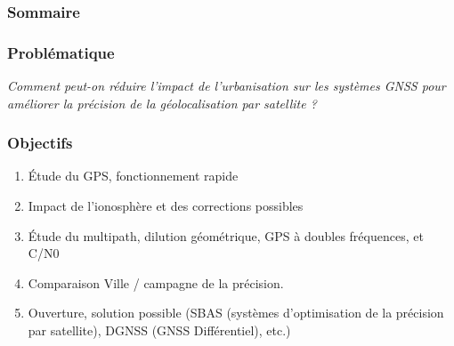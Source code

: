\documentclass[xcolor=dvipsnames,envcountsect]{beamer}
\begin{document}
\begin{frame}{\frametitle{Sommaire}\tableofcontents}\end{frame}

\begin{frame}
	\frametitle{Problématique}
	\centering
	\begin{block}
		\scshape
			\begin{center}
				\Huge\emph{Comment peut-on réduire l'impact de l'urbanisation sur les systèmes GNSS pour améliorer la
				précision de la géolocalisation par satellite ?}
			\end{center}
	\end{block}
\end{frame}

\begin{frame}
	\frametitle{Objectifs}
	\justifying
	\begin{enumerate}
		
		\item Étude du GPS, fonctionnement rapide
		\item Impact de l'ionosphère et des corrections possibles
		\item Étude du multipath, dilution géométrique, GPS à doubles fréquences, et C/N0
		\item Comparaison Ville / campagne de la précision.
		\item Ouverture, solution possible (SBAS (systèmes d'optimisation de la précision par satellite), DGNSS (GNSS Différentiel), etc.)
	
	\end{enumerate}
\end{frame}
\end{document}
